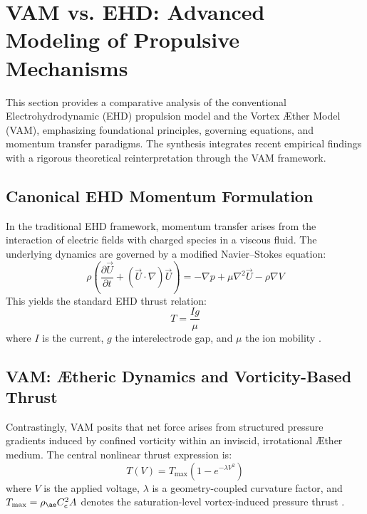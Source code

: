 
\section{VAM vs. EHD: Advanced Modeling of Propulsive Mechanisms}


This section provides a comparative analysis of the conventional Electrohydrodynamic (EHD) propulsion model and the Vortex \AE{}ther Model (VAM), emphasizing foundational principles, governing equations, and momentum transfer paradigms. The synthesis integrates recent empirical findings \cite{ehdreview2023} \cite{ehdpropeller2023} \cite{electricfluidsetup2023} \cite{ehdmodeling2023} with a rigorous theoretical reinterpretation through the VAM framework.


\subsection{Canonical EHD Momentum Formulation}
In the traditional EHD framework, momentum transfer arises from the interaction of electric fields with charged species in a viscous fluid. The underlying dynamics are governed by a modified Navier--Stokes equation:
\begin{equation}
\rho \left( \frac{\partial \vec{U}}{\partial t} + (\vec{U} \cdot \nabla)\vec{U} \right) = -\nabla p + \mu \nabla^2 \vec{U} - \rho \nabla V
\end{equation}
This yields the standard EHD thrust relation:
\begin{equation}
T = \frac{I g}{\mu}
\end{equation}
where $I$ is the current, $g$ the interelectrode gap, and $\mu$ the ion mobility \cite{ehdreview2023}.


\subsection{VAM: Ætheric Dynamics and Vorticity-Based Thrust}
Contrastingly, VAM posits that net force arises from structured pressure gradients induced by confined vorticity within an inviscid, irrotational \AE{}ther medium. The central nonlinear thrust expression is:
\begin{equation}
T(V) = T_{\text{max}}(1 - e^{-\lambda V^2})
\end{equation}
where $V$ is the applied voltage, $\lambda$ is a geometry-coupled curvature factor, and $T_{\text{max}} = \rho_{\ae} C_e^2 A$ denotes the saturation-level vortex-induced pressure thrust \cite{vamderive2024}.



